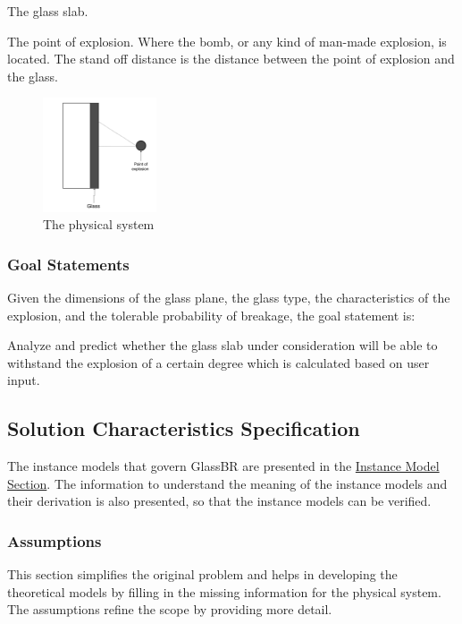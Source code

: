 \documentclass[12pt]{article}
\begin{document}
\begin{description}[font=\normalfont]
\item[PS1:]{The glass slab.}
\item[PS2:]{The point of explosion. Where the bomb, or any kind of man-made explosion, is located. The stand off distance is the distance between the point of explosion and the glass.}
\end{description}
\begin{figure}[H]
\begin{center}
\includegraphics[width=0.3\textwidth]{../../../../datafiles/glassbr/physicalsystimage.png}
\caption{The physical system}
\label{Figure:physSystImage}
\end{center}
\end{figure}
\subsubsection{Goal Statements}
\label{Sec:GoalStmt}
Given the dimensions of the glass plane, the glass type, the characteristics of the explosion, and the tolerable probability of breakage, the goal statement is:

\begin{description}[font=\normalfont]
\item[Predict-Glass-Withstands-Explosion:\phantomsection\label{willBreakGS}]{Analyze and predict whether the glass slab under consideration will be able to withstand the explosion of a certain degree which is calculated based on user input.}
\end{description}
\subsection{Solution Characteristics Specification}
\label{Sec:SolCharSpec}
The instance models that govern GlassBR are presented in the \hyperref[Sec:IMs]{Instance Model Section}. The information to understand the meaning of the instance models and their derivation is also presented, so that the instance models can be verified.

\subsubsection{Assumptions}
\label{Sec:Assumps}
This section simplifies the original problem and helps in developing the theoretical models by filling in the missing information for the physical system. The assumptions refine the scope by providing more detail.
\end{document}

